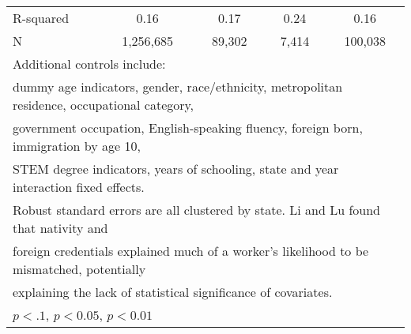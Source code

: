 \begin{table}[htbp]
\begin{tabular}{l*{4}{c}}
R-squared           &        0.16         &        0.17         &        0.24         &        0.16         \\
N                   &   1,256,685         &      89,302         &       7,414         &     100,038         \\
\bottomrule
\multicolumn{5}{l}{\footnotesize Additional controls include:}\\
\multicolumn{5}{l}{\footnotesize dummy age indicators, gender, race/ethnicity, metropolitan residence, occupational category,}\\
\multicolumn{5}{l}{\footnotesize government occupation, English-speaking fluency, foreign born, immigration by age 10,}\\
\multicolumn{5}{l}{\footnotesize STEM degree indicators, years of schooling, state and year interaction fixed effects.}\\
\multicolumn{5}{l}{\footnotesize Robust standard errors are all clustered by state. Li and Lu found that nativity and}\\
\multicolumn{5}{l}{\footnotesize foreign credentials explained much of a worker's likelihood to be mismatched, potentially}\\
\multicolumn{5}{l}{\footnotesize explaining the lack of statistical significance of covariates.}\\
\multicolumn{5}{l}{\footnotesize \sym{*} \(p<.1\), \sym{**} \(p<0.05\), \sym{***} \(p<0.01\)}\\
\end{tabular}
\end{table}

